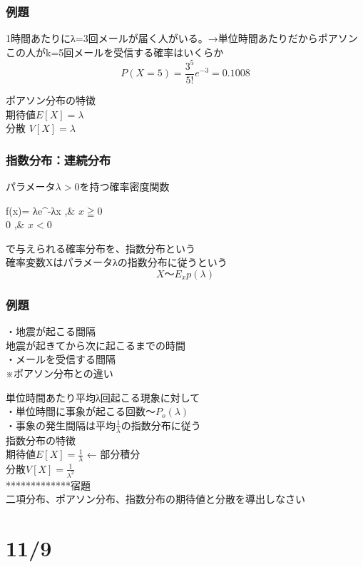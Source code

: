 \documentclass{jsarticle}
\begin{document}
			\subsubsection{例題}
				1時間あたりにλ=3回メールが届く人がいる。→単位時間あたりだからポアソン\\
				この人がk=5回メールを受信する確率はいくらか
				\[
					P(X=5)=\frac{3^5}{5!}e^{-3}=0.1008
				\]
				
				
				ポアソン分布の特徴\\
				期待値$E[X]=λ$\\
				分散 $V[X]=λ$
		\subsubsection{指数分布：連続分布}
			パラメータ$λ>0$を持つ確率密度関数
			\begin{numcases}
				f(x)={}
					λe^{-λx} ,& $x≧0$\\
					0             ,& $x < 0$
			\end{numcases}
			で与えられる確率分布を、指数分布という\\
			
				
			確率変数Xはパラメータλの指数分布に従うという
			\[
				X〜E_xp(λ)
			\]
			\subsubsection{例題}
			・地震が起こる間隔\\
			地震が起きてから次に起こるまでの時間\\
			・メールを受信する間隔\\
			※ポアソン分布との違い
			
			単位時間あたり平均λ回起こる現象に対して\\
			・単位時間に事象が起こる回数$〜P_o(λ)$\\
			・事象の発生間隔は平均$\frac{1}{λ}$の指数分布に従う\\
		
			指数分布の特徴\\
			期待値$E[X]=\frac{1}{λ}$ ← 部分積分 \\
			分散$V[X]=\frac{1}{λ^2}$\\
			
			*************宿題\\
			二項分布、ポアソン分布、指数分布の期待値と分散を導出しなさい\\

\section{11/9}
\end{document}
